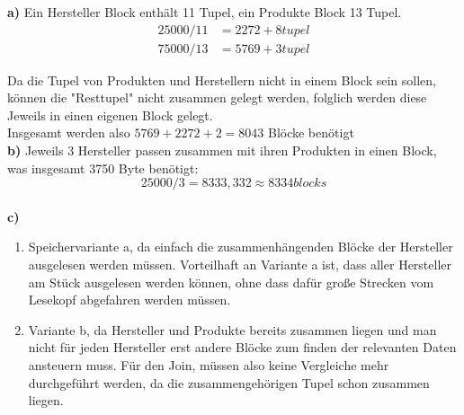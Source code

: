 \documentclass[12pt]{article}
\begin{document}
\textbf{a)}  Ein Hersteller Block enthält 11 Tupel, ein Produkte Block 13 Tupel.
\begin{align*}
    25000 / 11 &=  2272 + 8 tupel\\
    75000 / 13 &=  5769 + 3 tupel 
\end{align*}

Da die Tupel von Produkten und Herstellern nicht in einem Block sein sollen,
können die "Resttupel" nicht zusammen gelegt werden, folglich werden diese
Jeweils in einen eigenen Block gelegt.\\
Insgesamt werden also $5769 + 2272 + 2 = 8043$ Blöcke benötigt 
\\[1em]
\textbf{b)}  Jeweils 3 Hersteller passen zusammen mit ihren Produkten in einen
Block, was insgesamt 3750 Byte benötigt:
$$25000 / 3 = 8333,332 \approx 8334 blocks$$
\\[1em]
\textbf{c)}
\begin{enumerate}
    \item Speichervariante a, da einfach die zusammenhängenden Blöcke der
        Hersteller ausgelesen werden 	müssen. Vorteilhaft an Variante a ist,
        dass aller Hersteller am Stück ausgelesen werden können, ohne dass dafür
        große Strecken vom Lesekopf abgefahren werden müssen.

    \item Variante b, da Hersteller und Produkte bereits zusammen liegen und man
        nicht für jeden Hersteller erst andere Blöcke zum finden der relevanten
        Daten ansteuern muss. Für den Join, müssen also keine Vergleiche mehr
        durchgeführt werden, da die zusammengehörigen Tupel schon zusammen liegen.
\end{enumerate}
\end{document}
